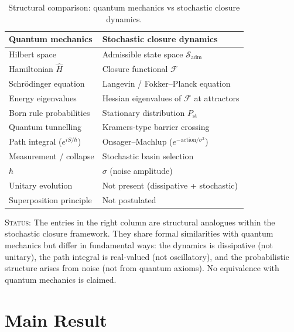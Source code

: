 \documentclass[12pt]{article}
\newcommand{\Fcal}{\mathcal{F}}
\newcommand{\Sadm}{\mathcal{S}_{\mathrm{adm}}}
\begin{document}
\begin{table}[ht]
\centering
\caption{Structural comparison: quantum mechanics vs stochastic closure dynamics.}
\label{tab:QM}
\begin{tabular}{@{}ll@{}}
\toprule
Quantum mechanics & Stochastic closure dynamics \\
\midrule
Hilbert space & Admissible state space $\Sadm$ \\
Hamiltonian $\hat{H}$ & Closure functional $\Fcal$ \\
Schr\"odinger equation & Langevin / Fokker--Planck equation \\
Energy eigenvalues & Hessian eigenvalues of $\Fcal$ at attractors \\
Born rule probabilities & Stationary distribution $P_{\mathrm{st}}$ \\
Quantum tunnelling & Kramers-type barrier crossing \\
Path integral ($e^{iS/\hbar}$) & Onsager--Machlup ($e^{-\text{action}/\sigma^2}$) \\
Measurement / collapse & Stochastic basin selection \\
$\hbar$ & $\sigma$ (noise amplitude) \\
Unitary evolution & Not present (dissipative + stochastic) \\
Superposition principle & Not postulated \\
\bottomrule
\end{tabular}
\end{table}

\textsc{Status:} The entries in the right column are structural analogues within the stochastic closure framework. They share formal similarities with quantum mechanics but differ in fundamental ways: the dynamics is dissipative (not unitary), the path integral is real-valued (not oscillatory), and the probabilistic structure arises from noise (not from quantum axioms). No equivalence with quantum mechanics is claimed.

\section{Main Result}\label{sec:theorem}
\end{document}

